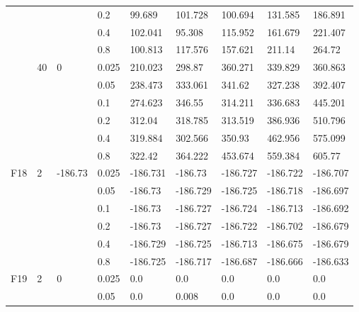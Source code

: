 \begin{longtable}{|l|l|l|l|l|l|l|l|l|}
\cmidrule{4-9} &     &          & 0.2            & 99.689     & 101.728    & 100.694    & 131.585    & 186.891    \\
\cmidrule{4-9} &     &          & 0.4            & 102.041    & 95.308     & 115.952    & 161.679    & 221.407    \\
\cmidrule{4-9} &     &          & 0.8            & 100.813    & 117.576    & 157.621    & 211.14     & 264.72     \\
\cmidrule{2-9} & 40  & 0        & 0.025          & 210.023    & 298.87     & 360.271    & 339.829    & 360.863    \\
\cmidrule{4-9} &     &          & 0.05           & 238.473    & 333.061    & 341.62     & 327.238    & 392.407    \\
\cmidrule{4-9} &     &          & 0.1            & 274.623    & 346.55     & 314.211    & 336.683    & 445.201    \\
\cmidrule{4-9} &     &          & 0.2            & 312.04     & 318.785    & 313.519    & 386.936    & 510.796    \\
\cmidrule{4-9} &     &          & 0.4            & 319.884    & 302.566    & 350.93     & 462.956    & 575.099    \\
\cmidrule{4-9} &     &          & 0.8            & 322.42     & 364.222    & 453.674    & 559.384    & 605.77     \\ \midrule
F18            & 2   & -186.73  & 0.025          & -186.731   & -186.73    & -186.727   & -186.722   & -186.707   \\
\cmidrule{4-9} &     &          & 0.05           & -186.73    & -186.729   & -186.725   & -186.718   & -186.697   \\
\cmidrule{4-9} &     &          & 0.1            & -186.73    & -186.727   & -186.724   & -186.713   & -186.692   \\
\cmidrule{4-9} &     &          & 0.2            & -186.73    & -186.727   & -186.722   & -186.702   & -186.679   \\
\cmidrule{4-9} &     &          & 0.4            & -186.729   & -186.725   & -186.713   & -186.675   & -186.679   \\
\cmidrule{4-9} &     &          & 0.8            & -186.725   & -186.717   & -186.687   & -186.666   & -186.633   \\ \midrule
F19            & 2   & 0        & 0.025          & 0.0        & 0.0        & 0.0        & 0.0        & 0.0        \\
\cmidrule{4-9} &     &          & 0.05           & 0.0        & 0.008      & 0.0        & 0.0        & 0.0        \\

\end{longtable}
